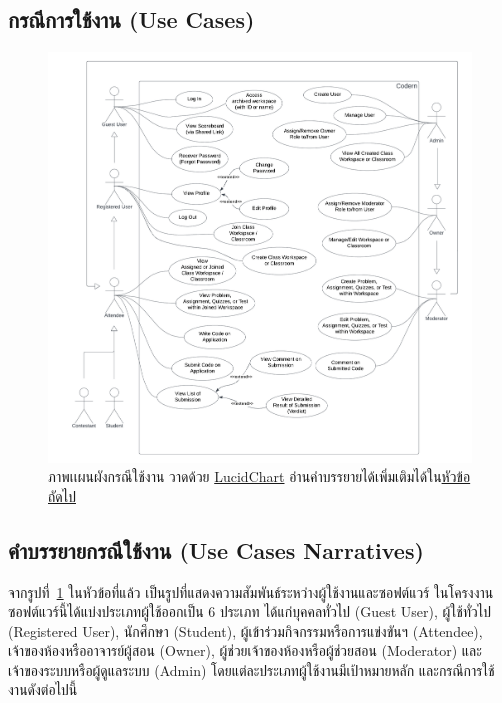 \documentclass[12pt,oneside,openright,a4paper]{cpe-thai-project}
\begin{document}
    \newpage
    \subsection{กรณีการใช้งาน (Use Cases)}
    \hypertarget{usecase}{
        \begin{figure}[!h]
        \centering
            \includegraphics[width=15cm]{figure/diagram/usecase-v4.png}
        \caption[ภาพเเผนผังกรณีใช้งาน]{ภาพเเผนผังกรณีใช้งาน วาดด้วย \href{https://lucid.app/}{LucidChart} อ่านคำบรรยายได้เพิ่มเติมได้ใน\hyperlink{usecase-narrates}{หัวข้อถัดไป}}\label{fig:usecase}
        \end{figure}
    }
    \pagebreak

    \hypertarget{usecase-narrates}{\subsection{คำบรรยายกรณีใช้งาน (Use Cases Narratives)}}
    จากรูปที่~\ref{fig:usecase} ในหัวข้อที่แล้ว เป็นรูปที่แสดงความสัมพันธ์ระหว่างผู้ใช้งานและซอฟต์แวร์ ในโครงงานซอฟต์แวร์นี้ได้แบ่งประเภทผู้ใช้ออกเป็น 6 ประเภท ได้แก่บุคคลทั่วไป (Guest User), ผู้ใช้ทั่วไป (Registered User), นักศึกษา (Student), ผู้เข้าร่วมกิจกรรมหรือการแข่งขันฯ (Attendee), เจ้าของห้องหรืออาจารย์ผู้สอน (Owner), ผู้ช่วยเจ้าของห้องหรือผู้ช่วยสอน (Moderator) และเจ้าของระบบหรือผู้ดูแลระบบ (Admin)
    โดยแต่ละประเภทผู้ใช้งานมีเป้าหมายหลัก และกรณีการใช้งานดังต่อไปนี้
\end{document}
